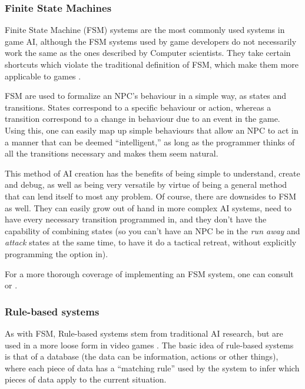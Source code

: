 \subsubsection{Finite State Machines}
\label{sec:finite-state-mach}

Finite State Machine (FSM) systems are the most commonly used systems in game
AI, although the FSM systems used by game developers do not necessarily work the
same as the ones described by Computer scientists. They take certain shortcuts
which violate the traditional definition of FSM, which make them more applicable
to games \citep{rabin2002implementing}.

FSM are used to formalize an NPC's behaviour in a simple way, as states and
transitions. States correspond to a specific behaviour or action, whereas a
transition correspond to a change in behaviour due to an event in the
game. Using this, one can easily map up simple behaviours that allow an NPC to
act in a manner that can be deemed ``intelligent,'' as long as the programmer
thinks of all the transitions necessary and makes them seem natural.

This method of AI creation has the benefits of being simple to understand,
create and debug, as well as being very versatile by virtue of being a general
method that can lend itself to most any problem. Of course, there are downsides
to FSM as well. They can easily grow out of hand in more complex AI systems,
need to have every necessary transition programmed in, and they don't have the
capability of combining states (so you can't have an NPC be in the \emph{run
  away} and \emph{attack} states at the same time, to have it do a tactical
retreat, without explicitly programming the option in).

For a more thorough coverage of implementing an FSM system, one can consult
\citet{rabin2002implementing} or \citet[][chap.~3]{kirby2011introduction}.

\subsubsection{Rule-based systems}
\label{sec:rule-based-systems}

As with FSM, Rule-based systems stem from traditional AI research, but are used
in a more loose form in video games \citep{christian2002simple}. The basic idea
of rule-based systems is that of a database (the data can be information,
actions or other things), where each piece of data has a ``matching rule'' used
by the system to infer which pieces of data apply to the current situation.

